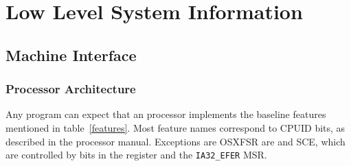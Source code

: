 \chapter{Low Level System Information}

\section{Machine Interface}

\subsection{Processor Architecture}

Any program can expect that an \xARCH processor implements the
baseline features mentioned in table~\ref{features}.  Most feature names
correspond to CPUID bits, as described in the processor manual.
Exceptions are OSXFSR are and SCE, which are controlled by bits in the
 register and the \verb|IA32_EFER| MSR.

